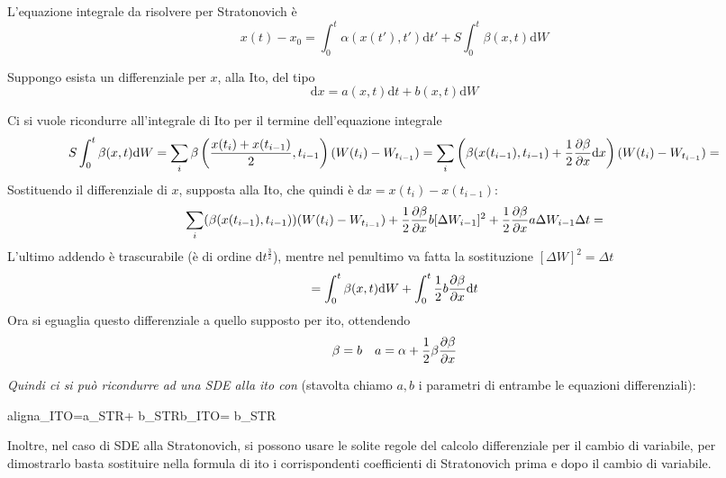 \documentclass[a4paper,12pt]{article}
\newcommand{\boxedeq}[2]{\begin{empheq}[box={\fboxsep=6pt\fbox}]{align}\label{#1}#2\end{empheq}}
\theoremstyle{plain}
\theoremstyle{definition}
\newcommand{\f}[2]{\frac{#1}{#2}}
\renewcommand{\d}{\text{d}}
\newcommand{\sint}{{S}\int}
\theoremstyle{remark}
\begin{document}
L'equazione integrale da risolvere per Stratonovich è
\[x(t)-x_0=\int_0^t \alpha(x(t'),t')\d t'+\sint_0^t	\beta(x,t) \d W		\]

Suppongo esista un differenziale per $x$, alla Ito, del tipo
\[\d x= a(x,t)\d t+b(x,t) \d W		\]

Ci si vuole ricondurre all'integrale di Ito per il termine dell'equazione integrale
\[\sint_0^t	\beta(x,t) \d W=\sum_i \beta\left(\f{x(t_i)+x(t_{i-1})}{2},t_{i-1}\right)(W(t_i)-W_{t_{i-1}})	=\sum_i \left(\beta(x({t_{i-1}}),t_{i-1})+\f{1}{2}\pdv{\beta}{x} \d x\right)(W(t_i)-W_{t_{i-1}})=	\]
Sostituendo il differenziale di $x$, supposta alla Ito, che quindi è $\d x=x(t_i)-x(t_{i-1})$:
\[\sum_i(\beta(x({t_{i-1}}),t_{i-1}))(W(t_i)-W_{t_{i-1}})+\f{1}{2}\pdv{\beta}{x} b[\Delta W_{i-1}]^2+\f{1}{2}\pdv{\beta}{x} a\Delta W_{i-1} \Delta t=\]
L'ultimo addendo è trascurabile (è di ordine $\d t^{\f{3}{2}}$), mentre nel penultimo va fatta la sostituzione $[\Delta W]^2=\Delta t$
\[=\int_0^t	\beta(x,t) \d W+\int_0^t	\f{1}{2}b\pdv{\beta}{x} \d t			\]
Ora si eguaglia questo differenziale a quello supposto per ito, ottendendo
\[\beta=b\quad a=\alpha+\f{1}{2}\beta\pdv{\beta}{x}		\]

\emph{Quindi ci si può ricondurre ad una SDE alla ito con} (stavolta chiamo $a,b$ i parametri di entrambe le equazioni differenziali):
\boxedeq{itostr}{a_{ITO}=a_{STR}+\f{1}{2} b_{STR}\pdv{b_{STR}}{x}\quad 	b_{ITO}= b_{STR}	}

Inoltre, nel caso di SDE alla Stratonovich, si possono usare le solite regole del calcolo differenziale per il cambio di variabile, per dimostrarlo basta sostituire nella formula di ito i corrispondenti coefficienti di Stratonovich prima e dopo il cambio di variabile.
\end{document}
